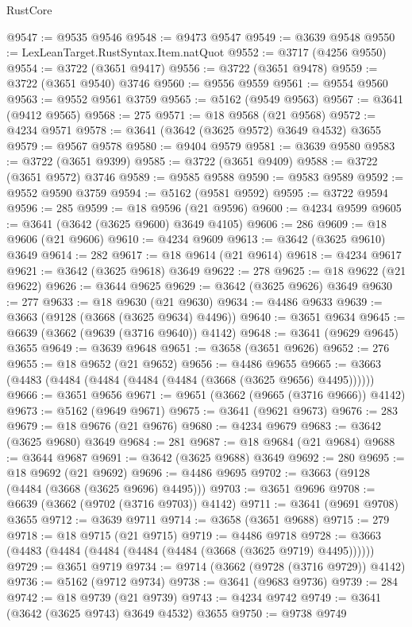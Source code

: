 \begin{lexlean}{RustCore}
\begin{coremodule}
@9547 := @9535 @9546
@9548 := @9473 @9547
@9549 := @3639 @9548
@9550 := LexLeanTarget.RustSyntax.Item.natQuot
@9552 := @3717 (@4256 @9550)
@9554 := @3722 (@3651 @9417)
@9556 := @3722 (@3651 @9478)
@9559 := @3722 (@3651 @9540) @3746
@9560 := @9556 @9559
@9561 := @9554 @9560
@9563 := @9552 @9561 @3759
@9565 := @5162 (@9549 @9563)
@9567 := @3641 (@9412 @9565)
@9568 := 275
@9571 := @18 @9568 (@21 @9568)
@9572 := @4234 @9571
@9578 := @3641 (@3642 (@3625 @9572) @3649 @4532) @3655
@9579 := @9567 @9578
@9580 := @9404 @9579
@9581 := @3639 @9580
@9583 := @3722 (@3651 @9399)
@9585 := @3722 (@3651 @9409)
@9588 := @3722 (@3651 @9572) @3746
@9589 := @9585 @9588
@9590 := @9583 @9589
@9592 := @9552 @9590 @3759
@9594 := @5162 (@9581 @9592)
@9595 := @3722 @9594
@9596 := 285
@9599 := @18 @9596 (@21 @9596)
@9600 := @4234 @9599
@9605 := @3641 (@3642 (@3625 @9600) @3649 @4105)
@9606 := 286
@9609 := @18 @9606 (@21 @9606)
@9610 := @4234 @9609
@9613 := @3642 (@3625 @9610) @3649
@9614 := 282
@9617 := @18 @9614 (@21 @9614)
@9618 := @4234 @9617
@9621 := @3642 (@3625 @9618) @3649
@9622 := 278
@9625 := @18 @9622 (@21 @9622)
@9626 := @3644 @9625
@9629 := @3642 (@3625 @9626) @3649
@9630 := 277
@9633 := @18 @9630 (@21 @9630)
@9634 := @4486 @9633
@9639 := @3663 (@9128 (@3668 (@3625 @9634) @4496))
@9640 := @3651 @9634
@9645 := @6639 (@3662 (@9639 (@3716 @9640)) @4142)
@9648 := @3641 (@9629 @9645) @3655
@9649 := @3639 @9648
@9651 := @3658 (@3651 @9626)
@9652 := 276
@9655 := @18 @9652 (@21 @9652)
@9656 := @4486 @9655
@9665 := @3663 (@4483 (@4484 (@4484 (@4484 (@4484 (@3668 (@3625 @9656) @4495))))))
@9666 := @3651 @9656
@9671 := @9651 (@3662 (@9665 (@3716 @9666)) @4142)
@9673 := @5162 (@9649 @9671)
@9675 := @3641 (@9621 @9673)
@9676 := 283
@9679 := @18 @9676 (@21 @9676)
@9680 := @4234 @9679
@9683 := @3642 (@3625 @9680) @3649
@9684 := 281
@9687 := @18 @9684 (@21 @9684)
@9688 := @3644 @9687
@9691 := @3642 (@3625 @9688) @3649
@9692 := 280
@9695 := @18 @9692 (@21 @9692)
@9696 := @4486 @9695
@9702 := @3663 (@9128 (@4484 (@3668 (@3625 @9696) @4495)))
@9703 := @3651 @9696
@9708 := @6639 (@3662 (@9702 (@3716 @9703)) @4142)
@9711 := @3641 (@9691 @9708) @3655
@9712 := @3639 @9711
@9714 := @3658 (@3651 @9688)
@9715 := 279
@9718 := @18 @9715 (@21 @9715)
@9719 := @4486 @9718
@9728 := @3663 (@4483 (@4484 (@4484 (@4484 (@4484 (@3668 (@3625 @9719) @4495))))))
@9729 := @3651 @9719
@9734 := @9714 (@3662 (@9728 (@3716 @9729)) @4142)
@9736 := @5162 (@9712 @9734)
@9738 := @3641 (@9683 @9736)
@9739 := 284
@9742 := @18 @9739 (@21 @9739)
@9743 := @4234 @9742
@9749 := @3641 (@3642 (@3625 @9743) @3649 @4532) @3655
@9750 := @9738 @9749

\end{coremodule}
\end{lexlean}
